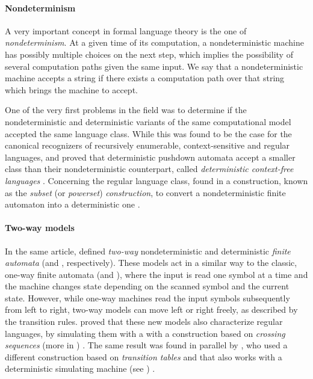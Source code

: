 \paragraph{Nondeterminism} A very important concept in formal language theory is the one of \emph{nondeterminism}.
At a given time of its computation, a nondeterministic machine has possibly multiple choices on the next step, which implies the possibility of several computation paths given the same input.
We say that a nondeterministic machine accepts a string if there exists a computation path over that string which brings the machine to accept.

One of the very first problems in the field was to determine if the nondeterministic and deterministic variants of the same computational model accepted the same language class.
While this was found to be the case for the canonical recognizers of recursively enumerable, context-sensitive and regular languages, \citeauthor{Fis63} and \citeauthor{Sch63} proved that deterministic pushdown automata accept a smaller class than their nondeterministic counterpart, called \emph{deterministic context-free languages} \cite{Fis63,Sch63}.
Concerning the regular language class, \citeauthor{RabSco59} found in \citeyear{RabSco59} a construction, known as the \emph{subset} (or \emph{powerset}) \emph{construction}, to convert a nondeterministic finite automaton into a deterministic one \cite{RabSco59}.

\paragraph{Two-way models} In the same article, \citeauthor{RabSco59} defined \emph{two-way} nondeterministic and deterministic \emph{finite automata} (\TNFAs and \TDFAs, respectively).
These models act in a similar way to the classic, one-way finite automata (\ONFAs and \ODFAs), where the input is read one symbol at a time and the machine changes state depending on the scanned symbol and the current state. However, while one-way machines read the input symbols subsequently from left to right, two-way models can move left or right freely, as described by the transition rules.
\citeauthor{RabSco59} proved that these new models also characterize regular languages, by simulating them with a \ONFA with a construction based on \emph{crossing sequences} (more in ) \cite{RabSco59}.
The same result was found in parallel by \citeauthor{She59}, who used a different construction based on \emph{transition tables} and that also works with a deterministic simulating machine (see ) \cite{She59}.




